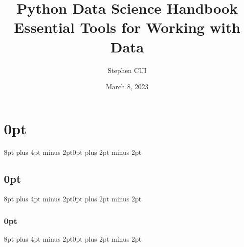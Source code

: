 \usepackage{amsmath, amssymb}
\usepackage{mathptmx}
\usepackage{siunitx}
\usepackage{ctex}
\usepackage{minted}
\usepackage{tcolorbox}
\usepackage{epigraph}
\usepackage{caption}
\usepackage{subcaption}
\usepackage{pdfpages}
\usepackage{graphicx}
\usepackage{listings}
\newtheorem{theorem}{Theorem}
\usepackage{tikz}
\usepackage{pifont}
\usepackage{tabularx}
\usepackage{framed}
\usepackage[lined,boxed,ruled]{algorithm2e}
\usepackage{titlesec}
\usepackage{bm}

\titlespacing\section{0pt}{8pt plus 4pt minus 2pt}{0pt plus 2pt minus 2pt}
\titlespacing\subsection{0pt}{8pt plus 4pt minus 2pt}{0pt plus 2pt minus 2pt}
\titlespacing\subsubsection{0pt}{8pt plus 4pt minus 2pt}{0pt plus 2pt minus 2pt}

\makeatletter
\let\old@endpart\@endpart
\renewcommand\@endpart[1][]{%
    \begin{quote}#1\end{quote}%
    \old@endpart}
\makeatother


\title{\textbf{Python Data Science Handbook}\\Essential Tools for Working with Data}

\author{Stephen CUI}
\date{March 8, 2023}

\newcommand\tips[1]{\textcolor{green!70!black}{#1}}
\newcommand\notes[1]{\textcolor{blue!70}{#1}}
\newcommand\important[1]{\textcolor{red!90!black}{#1}}

\newcommand\figures[1]{
    \begin{figure}
        \centering
        \texttt{[image: ../Figures/\#1.png]}
        \caption{#1}
        \label{#1}
    \end{figure}
}

